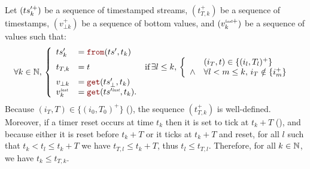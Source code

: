 \begin{skippableproof}
    Let $(ts^{\prime+}_k)$ be a sequence of timestamped streams, $(t_{T, k}^+)$ be a sequence of
    timestamps, $(v_{\bot k}^+)$ be a sequence of bottom values, and $(v^{{\textit{\tiny last}}+}_k)$ be a
    sequence of values such that:
    \begin{equation*}
        \begin{array}{l}
            \forall k \in \N, \,
            \left\{
            \begin{array}{lll}
                \ts'_k       & = \from{\ts'}{t_k}                   &                                          \\
                t_{T, k}     & = t                                  & \text{if} \, \exists l \le k, \, \left\{
                \begin{array}{ll}
                           & (i_T, t) \in \{(i_l, T_l)^+\}                \\
                    \wedge & \forall l < m \le k, \, i_T \notin \{i_m^+\}
                \end{array}
                \right.                                                                                        \\
                v_{\bot k}   & = \getAt{\ts'_\bot}{t_k}             &                                          \\
                v^\explast_k & = \getAt{\ts^{\prime\explast}}{t_k}. &                                          \\
            \end{array}
            \right.
        \end{array}
    \end{equation*}
    Because $(i_T, T) \in \{(i_0, T_0)^+\}$ (),
    the sequence $(t_{T, k}^+)$ is well-defined. Moreover, if a timer reset occurs at time $t_k$ then it
    is set to tick at $t_k + T$ (), and because either it is reset before $t_k + T$
    or it ticks at $t_k + T$ and reset, for all $l$ such that $t_k < t_l \le t_k + T$ we have
    $t_{T, l} \le t_k + T$, thus $t_l \le t_{T, l}$. Therefore, for all $k \in \mathbb{N}$, we have $t_k \le
        t_{T, k}$.


\end{skippableproof}
